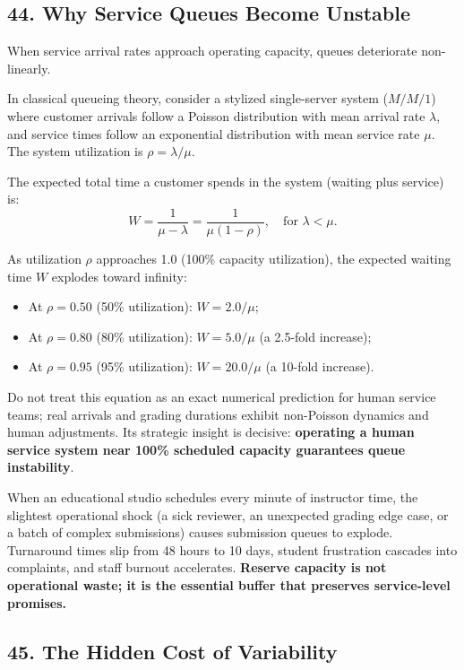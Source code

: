 \subsection*{44. Why Service Queues Become Unstable}

When service arrival rates approach operating capacity, queues deteriorate non-linearly.

In classical queueing theory, consider a stylized single-server system ($M/M/1$) where customer arrivals follow a Poisson distribution with mean arrival rate $\lambda$, and service times follow an exponential distribution with mean service rate $\mu$. The system utilization is $\rho = \lambda / \mu$.

The expected total time a customer spends in the system (waiting plus service) is:
\begin{equation}
W = \frac{1}{\mu - \lambda} = \frac{1}{\mu(1 - \rho)},\quad \text{for } \lambda < \mu.
\end{equation}

As utilization $\rho$ approaches 1.0 (100\% capacity utilization), the expected waiting time $W$ explodes toward infinity:
\begin{itemize}
    \item At $\rho = 0.50$ (50\% utilization): $W = 2.0 / \mu$;
    \item At $\rho = 0.80$ (80\% utilization): $W = 5.0 / \mu$ (a 2.5-fold increase);
    \item At $\rho = 0.95$ (95\% utilization): $W = 20.0 / \mu$ (a 10-fold increase).
\end{itemize}

Do not treat this equation as an exact numerical prediction for human service teams; real arrivals and grading durations exhibit non-Poisson dynamics and human adjustments. Its strategic insight is decisive: \textbf{operating a human service system near 100\% scheduled capacity guarantees queue instability}.

When an educational studio schedules every minute of instructor time, the slightest operational shock (a sick reviewer, an unexpected grading edge case, or a batch of complex submissions) causes submission queues to explode. Turnaround times slip from 48 hours to 10 days, student frustration cascades into complaints, and staff burnout accelerates. \textbf{Reserve capacity is not operational waste; it is the essential buffer that preserves service-level promises.}

\subsection*{45. The Hidden Cost of Variability}

